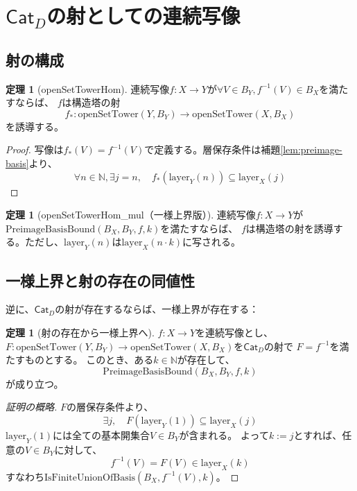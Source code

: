 \documentclass[a4paper,12pt]{ltjsarticle}
\theoremstyle{definition}
\newtheorem{theorem}[definition]{定理}
\newcommand{\N}{\mathbb{N}}
\newcommand{\catD}{\mathsf{Cat}_D}
\begin{document}
\section{$\catD$の射としての連続写像}

\subsection{射の構成}

\begin{theorem}[openSetTowerHom]
連続写像$f: X \to Y$が$\forall V \in B_Y, f^{-1}(V) \in B_X$を満たすならば、
$f$は構造塔の射
\[
f_* : \mathrm{openSetTower}(Y, B_Y) \longrightarrow \mathrm{openSetTower}(X, B_X)
\]
を誘導する。
\end{theorem}

\begin{proof}
写像は$f_*(V) = f^{-1}(V)$で定義する。層保存条件は補題\ref{lem:preimage-basis}より、
\[
\forall n \in \N, \exists j = n, \quad f_*(\mathrm{layer}_Y(n)) \subseteq \mathrm{layer}_X(j)
\]
\end{proof}

\begin{theorem}[openSetTowerHom\_mul（一様上界版）]
連続写像$f: X \to Y$が$\mathrm{PreimageBasisBound}(B_X, B_Y, f, k)$を満たすならば、
$f$は構造塔の射を誘導する。ただし、$\mathrm{layer}_Y(n)$は$\mathrm{layer}_X(n \cdot k)$に写される。
\end{theorem}

\subsection{一様上界と射の存在の同値性}

逆に、$\catD$の射が存在するならば、一様上界が存在する：

\begin{theorem}[射の存在から一様上界へ]\label{thm:hom-to-bound}
$f: X \to Y$を連続写像とし、
$F: \mathrm{openSetTower}(Y, B_Y) \to \mathrm{openSetTower}(X, B_X)$を$\catD$の射で
$F = f^{-1}$を満たすものとする。
このとき、ある$k \in \N$が存在して、
\[
\mathrm{PreimageBasisBound}(B_X, B_Y, f, k)
\]
が成り立つ。
\end{theorem}

\begin{proof}[証明の概略]
$F$の層保存条件より、
\[
\exists j, \quad F(\mathrm{layer}_Y(1)) \subseteq \mathrm{layer}_X(j)
\]
$\mathrm{layer}_Y(1)$には全ての基本開集合$V \in B_Y$が含まれる。
よって$k := j$とすれば、任意の$V \in B_Y$に対して、
\[
f^{-1}(V) = F(V) \in \mathrm{layer}_X(k)
\]
すなわち$\mathrm{IsFiniteUnionOfBasis}(B_X, f^{-1}(V), k)$。
\end{proof}
\end{document}
